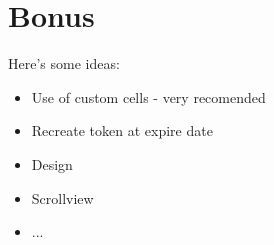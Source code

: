 \documentclass{42}
\begin{document}

\newpage
    \chapter{Bonus}

    Here's some ideas:\\
    \vspace{5mm}
        \begin{itemize}\itemsep1pt
            \item Use of custom cells - very recomended
            \item Recreate token at expire date
            \item Design
            \item Scrollview
            \item ...
        \end{itemize}
\end{document}
